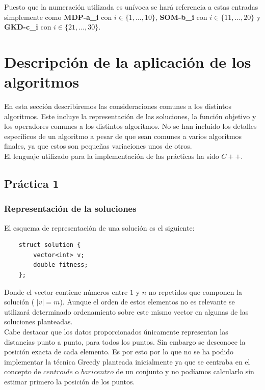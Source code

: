 \documentclass[11pt,a4paper]{article}
\begin{document}
	Puesto que la numeración utilizada es unívoca se hará referencia a estas entradas simplemente como \textbf{MDP-a\_i} con $i\in\{1,\dotsc,10\}$, \textbf{SOM-b\_i} con $i\in\{11,\dotsc,20\}$ y \textbf{GKD-c\_i} con $i\in\{21,\dotsc,30\}$.
	
	\section{Descripción de la aplicación de los algoritmos}
	
	En esta sección describiremos las consideraciones comunes a los distintos algoritmos. Este incluye la representación de las soluciones, la función objetivo y los operadores comunes a los distintos algoritmos. No se han incluido los detalles específicos de un algoritmo a pesar de que sean comunes a varios algoritmos finales, ya que estos son pequeñas variaciones unos de otros.  \\
	
	El lenguaje utilizado para la implementación de las prácticas ha sido $C++$. 
	
	\subsection{Práctica 1}
	
	\subsubsection{Representación de la soluciones}
	
	El esquema de representación de una solución es el siguiente:

	\begin{lstlisting}
	struct solution {
		vector<int> v;
		double fitness;
	};
	\end{lstlisting}
	
	Donde el vector contiene números entre $1$ y $n$ no repetidos que componen la solución ( $|v| = m$). Aunque el orden de estos elementos no es relevante se utilizará determinado ordenamiento sobre este mismo vector en algunas de las soluciones planteadas. \\
	
	Cabe destacar que los datos proporcionados únicamente representan las distancias punto a punto, para todos los puntos. Sin embargo se desconoce la posición exacta de cada elemento. Es por esto por lo que no se ha podido implementar la técnica Greedy planteada inicialmente ya que se centraba en el concepto de $centroide$ o $baricentro$ de un conjunto y no podíamos calcularlo sin estimar primero la posición de los puntos. \\
	
\end{document}
